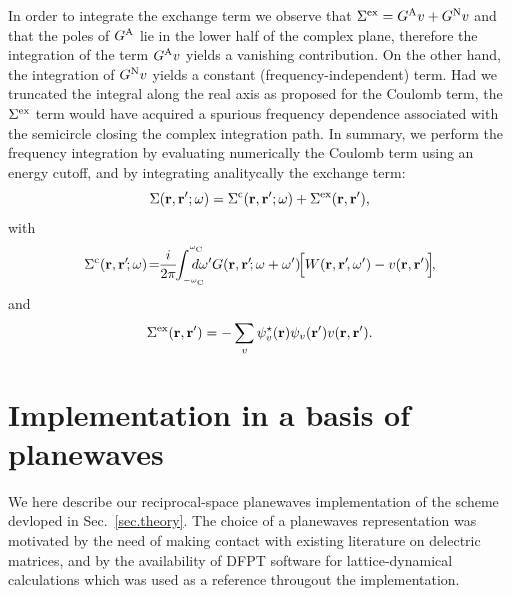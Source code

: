 \documentclass[twocolumn,prb,showpacs,superscriptaddress]{revtex4}
\def\w{\omega}
\def\wp{\omega^\prime}
\def\wc{{\omega_{\rm C}}}
\def\r{{\bf r}}
\def\rp{{\bf r^\prime}}
\begin{document}
In order to integrate the exchange term we observe that $\Sigma^{\rm ex}=G^{\rm A}v + G^{\rm N}v$
and that the poles of $G^{\rm A}$ lie in the lower half of the complex plane, therefore
the integration of the term $G^{\rm A}v$ yields a vanishing contribution.
On the other hand, the integration of $G^{\rm N}v$ yields a constant (frequency-independent) term.
Had we truncated the integral along the real axis as proposed for the Coulomb term, 
the $\Sigma^{\rm ex}$ term would have acquired a spurious frequency dependence associated with
the semicircle closing the complex integration path.
In summary, we perform the frequency integration by evaluating numerically
the Coulomb term using an energy cutoff, and by integrating analitycally the exchange term:
  \begin{equation}
  \Sigma(\r,\rp;\w) = \Sigma^{\rm c}(\r,\rp;\w) + \Sigma^{\rm ex}(\r,\rp),
  \end{equation}
with
  \begin{equation}
 \Sigma^{\rm c}(\r,\rp\!;\w) \! = \!\! \frac{i}{2\pi} \!\!\int_{_{-\wc}}^{^\wc} \!\!\!\!\!\!\!d\wp 
 G(\r,\rp\!;\w+\wp) \!\Big[W(\r,\rp\!,\wp)-v(\r,\rp)\!\Big]\!,
  \end{equation}
and
  \begin{equation}
  \Sigma^{\rm ex}(\r,\rp) = - \sum_v \psi_v^\star(\r)\psi_v(\rp) v(\r,\rp).
  \end{equation}


\section{Implementation in a basis of planewaves}\label{sec.theory.g}

We here describe our reciprocal-space planewaves implementation of the scheme 
devloped in Sec.\ \ref{sec.theory}. The choice of a planewaves representation
was motivated by the need of making contact with existing literature on delectric
matrices,\cite{cpm,hl86-prb,balde_tosa,baroni-resta} 
and by the availability of DFPT software for lattice-dynamical
calculations\cite{espresso} which was used as a reference througout the implementation.
\end{document}
